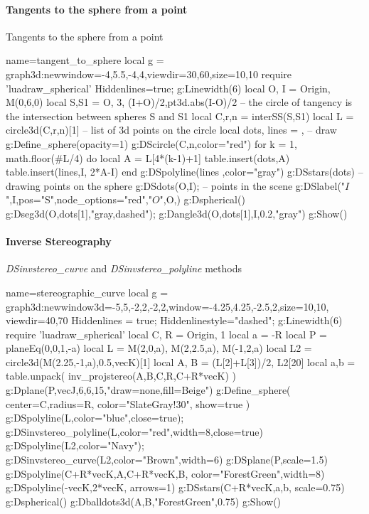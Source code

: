 \paragraph{Tangents to the sphere from a point}

\begin{demo}{Tangents to the sphere from a point}
\begin{luadraw}{name=tangent_to_sphere}
local g = graph3d:new{window={-4,5.5,-4,4},viewdir={30,60},size={10,10}}
require 'luadraw_spherical'
Hiddenlines=true; g:Linewidth(6)
local O, I = Origin, M(0,6,0)
local S,S1 = {O, 3}, {(I+O)/2,pt3d.abs(I-O)/2}
-- the circle of tangency is the intersection between spheres S and S1
local C,r,n = interSS(S,S1) 
local L = circle3d(C,r,n)[1] -- list of 3d points on the circle
local dots, lines = {}, {}
-- draw
g:Define_sphere({opacity=1})
g:DScircle({C,n},{color="red"})
for k = 1, math.floor(#L/4) do
    local A = L[4*(k-1)+1]
    table.insert(dots,A)
    table.insert(lines,{I, 2*A-I})
end
g:DSpolyline(lines ,{color="gray"})
g:DSstars(dots) -- drawing points on the sphere
g:DSdots({O,I});  -- points in the scene
g:DSlabel("$I$",I,{pos="S",node_options="red"},"$O$",O,{})
g:Dspherical()
g:Dseg3d({O,dots[1]},"gray,dashed"); g:Dangle3d(O,dots[1],I,0.2,"gray")
g:Show() 
\end{luadraw}
\end{demo}

\paragraph{Inverse Stereography}

\begin{demo}{\emph{DSinvstereo\_curve} and \emph{DSinvstereo\_polyline} methods}
\begin{luadraw}{name=stereographic_curve}
local g = graph3d:new{window3d={-5,5,-2,2,-2,2},window={-4.25,4.25,-2.5,2},size={10,10}, viewdir={40,70}}
Hiddenlines = true; Hiddenlinestyle="dashed"; g:Linewidth(6)
require 'luadraw_spherical'
local C, R = Origin, 1
local a = -R
local P = planeEq(0,0,1,-a)
local L = {M(2,0,a), M(2,2.5,a), M(-1,2,a)}
local L2 = circle3d(M(2.25,-1,a),0.5,vecK)[1]
local A, B = (L[2]+L[3])/2, L2[20]
local a,b = table.unpack( inv_projstereo({A,B},{C,R},C+R*vecK) )
g:Dplane(P,vecJ,6,6,15,"draw=none,fill=Beige")
g:Define_sphere( {center=C,radius=R, color="SlateGray!30", show=true} )
g:DSpolyline(L,{color="blue",close=true}); g:DSinvstereo_polyline(L,{color="red",width=8,close=true})
g:DSpolyline(L2,{color="Navy"}); g:DSinvstereo_curve(L2,{color="Brown",width=6})
g:DSplane(P,{scale=1.5})
g:DSpolyline({{C+R*vecK,A},{C+R*vecK,B}}, {color="ForestGreen",width=8})
g:DSpolyline({{-vecK,2*vecK}}, {arrows=1})
g:DSstars({C+R*vecK,a,b}, {scale=0.75})
g:Dspherical()
g:Dballdots3d({A,B},"ForestGreen",0.75)
g:Show()
\end{luadraw}
\end{demo}


